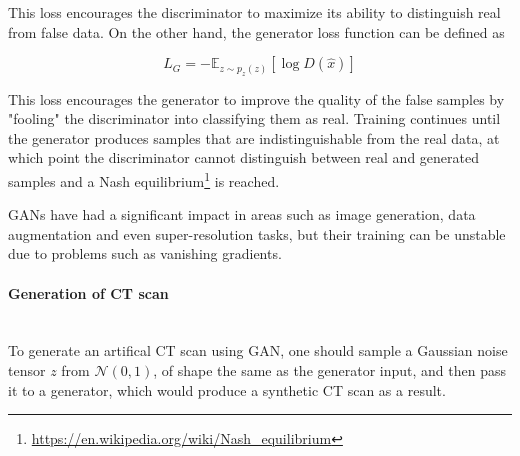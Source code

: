 This loss encourages the discriminator to maximize its ability to distinguish real from false data. On the other hand, the generator loss function can be defined as


\begin{equation}
L_G = - \mathbb{E}_{z \sim p_z(z)}[\log D(\hat{x})]
\end{equation}


This loss encourages the generator to improve the quality of the false samples by "fooling" the discriminator into classifying them as real. Training continues until the generator produces samples that are indistinguishable from the real data, at which point the discriminator cannot distinguish between real and generated samples and a Nash equilibrium\footnote{\url{https://en.wikipedia.org/wiki/Nash_equilibrium}} is reached.

GANs have had a significant impact in areas such as image generation, data augmentation and even super-resolution tasks, but their training can be unstable due to problems such as vanishing gradients. 


\paragraph{Generation of CT scan}\mbox{}\\

To generate an artifical CT scan using GAN, one should sample a Gaussian noise tensor $z$ from $\mathcal{N}(0,1)$, of shape the same as the generator input, and then pass it to a generator, which would produce a synthetic CT scan as a result.